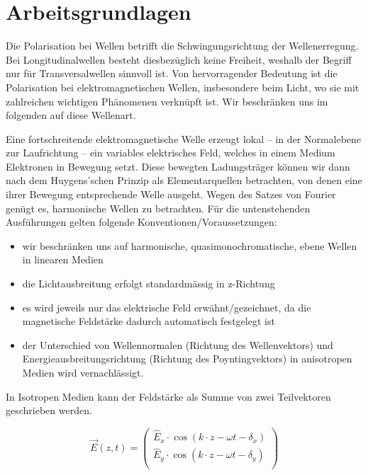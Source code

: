 \section{Arbeitsgrundlagen}

Die Polarisation bei Wellen betrifft die Schwingungsrichtung der Wellenerregung.
Bei  Longitudinalwellen  besteht  diesbez\"uglich  keine Freiheit,  weshalb  der
Begriff nur  f\"ur  Transversalwellen sinnvoll ist. Von hervorragender Bedeutung
ist die Polarisation bei elektromagnetischen Wellen, insbesondere beim Licht, wo
sie  mit  zahlreichen wichtigen Ph\"anomenen verkn\"upft ist. Wir  beschr\"anken
uns im folgenden auf diese Wellenart.

Eine  fortschreitende  elektromagnetische   Welle   erzeugt   lokal  --  in  der
Normalebene zur Laufrichtung  --  ein  variables  elektrisches  Feld, welches in
einem  Medium  Elektronen in  Bewegung  setzt.  Diese  bewegten  Ladungstr\"ager
k\"onnen  wir  dann   nach   dem   Huygens'schen  Prinzip  als  Elementarquellen
betrachten, von denen eine ihrer Bewegung entsprechende Welle ausgeht. Wegen des
Satzes  von  Fourier  gen\"ugt es, harmonische Wellen zu betrachten.  F\"ur  die
untenstehenden   Ausf\"uhrungen  gelten  folgende  Konventionen/Voraussetzungen:

\begin{itemize}
    \item wir beschr\"anken uns auf harmonische, quasimonochromatische, ebene Wellen
    in linearen Medien
    \item die Lichtausbreitung erfolgt standardm\"assig in z-Richtung
    \item  es  wird  jeweils  nur  das elektrische Feld erw\"ahnt/gezeichnet, da die
    magnetische Feldst\"arke dadurch automatisch festgelegt ist
    \item  der  Unterschied  von  Wellennormalen  (Richtung  des  Wellenvektors) und
    Energieausbreitungsrichtung (Richtung des Poyntingvektors) in anisotropen Medien
    wird vernachl\"assigt.
\end{itemize}

In Isotropen Medien kann der Feldst\"arke als Summe von zwei Teilvektoren geschrieben werden.

\begin{equation}
    \vec{E}(z,t) = \begin{pmatrix}
        \hat{E}_x\cdot\cos(k \cdot z - \omega t - \delta_x) \\
        \hat{E}_y\cdot\cos(k \cdot z - \omega t - \delta_y) \\
    \end{pmatrix}
    \label{eq:welle}
\end{equation}

